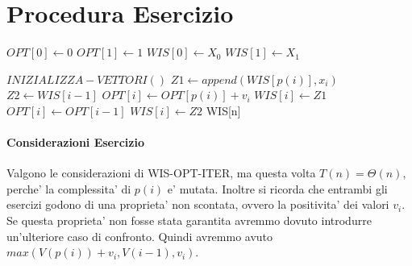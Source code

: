 \newpage

\section{Procedura Esercizio}

\begin{algorithm}
    \begin{algorithmic}
            \State $OPT[0] \gets 0$
            \State $OPT[1] \gets 1$
            \State $WIS[0] \gets X_0$
            \State $WIS[1] \gets X_1$
        \EndProcedure
    \end{algorithmic}
\end{algorithm}

\begin{algorithm}
    \begin{algorithmic}
            \State $INIZIALIZZA-VETTORI()$
                \State $Z1 \gets append(WIS[p(i)], x_i)$
                \State $Z2 \gets WIS[i-1]$
                    \State $OPT[i] \gets OPT[p(i)] + v_i$
                    \State $WIS[i] \gets Z1$
                \Else
                    \State $OPT[i] \gets OPT[i-1]$
                    \State $WIS[i] \gets Z2$
                \EndIf
            \EndFor
            \State \Return WIS[n]
        \EndProcedure
    \end{algorithmic}
\end{algorithm}

\paragraph{Considerazioni Esercizio}

Valgono le considerazioni di WIS-OPT-ITER, ma questa volta $T(n) = \Theta(n)$, perche' la complessita' di $p(i)$ e' mutata.
Inoltre si ricorda che entrambi gli esercizi godono di una proprieta' non scontata, ovvero la positivita' dei valori $v_i$.
Se questa proprieta' non fosse stata garantita avremmo dovuto introdurre un'ulteriore caso di confronto.
Quindi avremmo avuto $max(V(p(i)) + v_i, V(i-1), v_i)$.